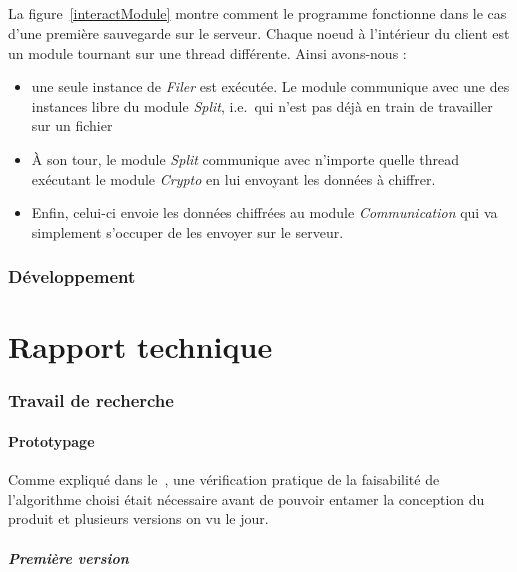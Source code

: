 \documentclass[a4paper,10pt, twoside]{report}
\begin{document}
\begin{spacing}{1.2}
\paragraph{}
La figure~\ref{interactModule} montre comment le programme fonctionne dans le
cas d'une premi\`ere sauvegarde sur le serveur. Chaque noeud \`a l'int\'erieur
du client est un module tournant sur une thread diff\'erente. Ainsi avons-nous :
\begin{itemize}
 \item une seule instance de \textit{Filer} est ex\'ecut\'ee. Le module
 communique avec une des instances libre du module \textit{Split}, i.e.~qui
 n'est pas d\'ej\`a en train de travailler sur un fichier
 \item \`A son tour, le module \textit{Split} communique avec n'importe quelle
 thread ex\'ecutant le module \textit{Crypto} en lui envoyant les donn\'ees \`a
 chiffrer.
 \item Enfin, celui-ci envoie les donn\'ees chiffr\'ees au module
 \textit{Communication} qui va simplement s'occuper de les envoyer sur le
 serveur.
\end{itemize}

\subsection{D\'eveloppement}

\chapter{Rapport technique}
\thispagestyle{fancy}
\label{rapportTechnique}
\subsection{Travail de recherche}
\subsubsection{Prototypage}
Comme expliqu\'e dans le~, une v\'erification pratique
de la faisabilit\'e de l'algorithme choisi \'etait n\'ecessaire avant de
pouvoir entamer la conception du produit et plusieurs versions on vu le jour.

\paragraph{Premi\`ere version}



\newpage
\listoffigures
\listoftables



\end{spacing}
\end{document}
